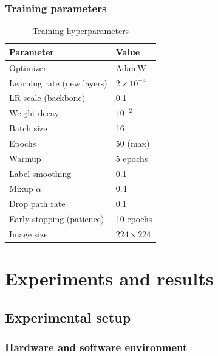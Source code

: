 \documentclass[14pt,a4paper]{extreport}
\begin{document}
\subsection{Training parameters}

\begin{table}[H]
\centering
\caption{Training hyperparameters}
\label{tab:hyperparams}
\begin{tabular}{ll}
\toprule
Parameter & Value \\
\midrule
Optimizer & AdamW \\
Learning rate (new layers) & $2 \times 10^{-4}$ \\
LR scale (backbone) & 0.1 \\
Weight decay & $10^{-2}$ \\
Batch size & 16 \\
Epochs & 50 (max) \\
Warmup & 5 epochs \\
Label smoothing & 0.1 \\
Mixup $\alpha$ & 0.4 \\
Drop path rate & 0.1 \\
Early stopping (patience) & 10 epochs \\
Image size & $224 \times 224$ \\
\bottomrule
\end{tabular}
\end{table}

\chapter{Experiments and results}
\label{ch:experiments}

\section{Experimental setup}

\subsection{Hardware and software environment}
\end{document}
